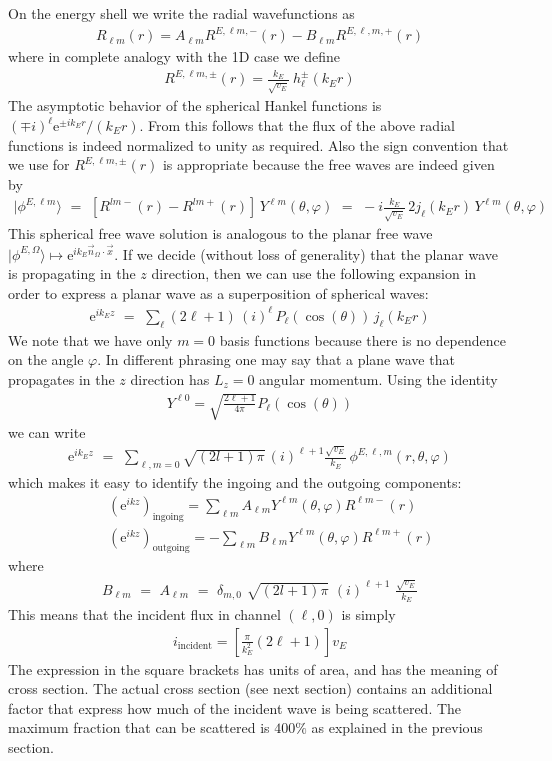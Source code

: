\documentclass[onecolumn,fleqn]{revtex4}
\newcommand{\eexp}{\mathrm{e}^}
\newcommand{\tbox}[1]{\text{#1}}
\newcommand{\beq}{\begin{eqnarray}}
\newcommand{\eeq}{\end{eqnarray}}
\begin{document}
On the energy shell we write the radial wavefunctions as 
\beq
R_{\ell m}(r) = A_{\ell m} R^{E,\ell m,-}(r) - B_{\ell m} R^{E,\ell,m,+}(r)
\eeq
where in complete analogy with the 1D case we define 
\beq
R^{E,\ell m,\pm}(r) = \frac{k_E}{\sqrt{v_E}} \ h_{\ell}^{\pm} (k_E r)
\eeq
The asymptotic behavior of the spherical Hankel functions 
is $(\mp i)^{\ell} \eexp{\pm i k_Er}/(k_Er)$. 
From this follows that the flux of the above radial functions 
is indeed normalized to unity as required.
Also the sign convention that we use for $R^{E,\ell m,\pm}(r)$ 
is appropriate because the free waves are indeed given by 
\beq
|\phi^{E,\ell m}\rangle 
\,\,=\,\,
[R^{lm-}(r)-R^{lm+}(r)] \, Y^{\ell m}(\theta,\varphi) 
\,\,=\,\,
-i\frac{k_E}{\sqrt{v_E}} \, 2j_{\ell}(k_Er) \, Y^{\ell m}(\theta,\varphi) 
\eeq
This spherical free wave solution is analogous to the planar 
free wave ${|\phi^{E,\Omega}\rangle \mapsto \eexp{ik_E\vec{n}_\Omega\cdot\vec{x}}}$.
If we decide (without loss of generality) 
that the planar wave is propagating in the $z$ direction,  
then we can use the following expansion in order 
to express a planar wave as a superposition of spherical waves:  
\beq
\eexp{ik_E z} \,\,=\,\, 
\sum_{\ell}(2\ell+1) \, (i)^{\ell} \, P_{\ell}( \cos(\theta) ) \, j_{\ell}(k_Er)
\eeq
We note that we have only $m=0$ basis functions because there 
is no dependence on the angle $\varphi$.  In different phrasing  
one may say that a plane wave that propagates in the $z$ direction 
has $L_z=0$ angular momentum. Using the identity
\beq
Y^{\ell 0} = \sqrt{\frac{2\ell+1}{4\pi}} P_{\ell}(\cos(\theta))
\eeq
we can write 
\beq
\eexp{ik_E z} \,\,=\,\, 
\sum_{\ell,m=0}\sqrt{(2l+1)\pi} 
\, (i)^{\ell{+}1}  \frac{\sqrt{v_E}}{k_E}   
\, \phi^{E,\ell,m}(r,\theta, \varphi)
\eeq
which makes it easy to identify the ingoing 
and the outgoing components: 
\beq
&& (\eexp{ikz})_{\tbox{ingoing}} 
= \sum_{\ell m} A_{\ell m} Y^{\ell m}(\theta,\varphi) R^{\ell m-}(r) 
\\ \nonumber
&& (\eexp{ikz})_{\tbox{outgoing}} 
= -\sum_{\ell m} B_{\ell m} Y^{\ell m}(\theta,\varphi) R^{\ell m+}(r)
\eeq
where
\beq
B_{\ell m} \,\,=\,\, A_{\ell m} \,\,=\,\,  
\delta_{m,0} 
\,\, \sqrt{(2l+1)\pi} 
\,\, (i)^{\ell{+}1} 
\,\, \frac{\sqrt{v_E}}{k_E}
\eeq
This means that the incident flux in channel $(\ell,0)$ is simply
\beq
i_{\tbox{incident}} = \left[ \frac{\pi}{k_E^2} (2\ell+1) \right] v_E
\eeq
The expression in the square brackets has 
units of area, and has the meaning of cross section.
The actual cross section (see next section) contains  
an additional factor that express how much 
of the incident wave is being scattered. 
The maximum fraction that can be scattered is $400\%$ 
as explained in the previous section.
\end{document}
